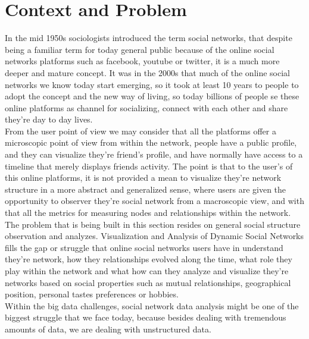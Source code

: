 %
%
%
%
%
\section{Context and Problem}
In the mid 1950s sociologists introduced the term social networks, that despite being a familiar term for today general public because of the online social networks platforms such as facebook, youtube or twitter, it is a much more deeper and mature concept. It was in the 2000s that much of the online social networks we know today start emerging, so it took at least 10 years to people to adopt the concept and the new way of living, so today billions of people se these online platforms as channel for socializing, connect with each other and share they're day to day lives.\\
\indent From the user point of view we may consider that all the platforms offer a microscopic point of view from within the network, people have a public profile, and they can visualize they're friend's profile, and have normally have access to a timeline that merely displays friends activity. The point is that to the user's of this online platforms, it is not provided a mean to visualize they're network structure in a more abstract and generalized sense, where users are given the opportunity to observer they're social network from a macroscopic view, and with that all the metrics for measuring nodes and relationships within the network.\\
\indent The problem that is being built in this section resides on general social structure observation and analyzes. Visualization and Analysis of Dynamic Social Networks fills the gap or struggle that online social networks users have in understand they're network, how they relationships evolved along the time, what role they play within the network and what how can they analyze and visualize they're networks based on social properties such as mutual relationships, geographical position, personal tastes preferences or hobbies.\\
\indent Within the big data challenges, social network data analysis might be one of the biggest struggle that we face today, because besides dealing with tremendous amounts of data, we are dealing with unstructured data.
